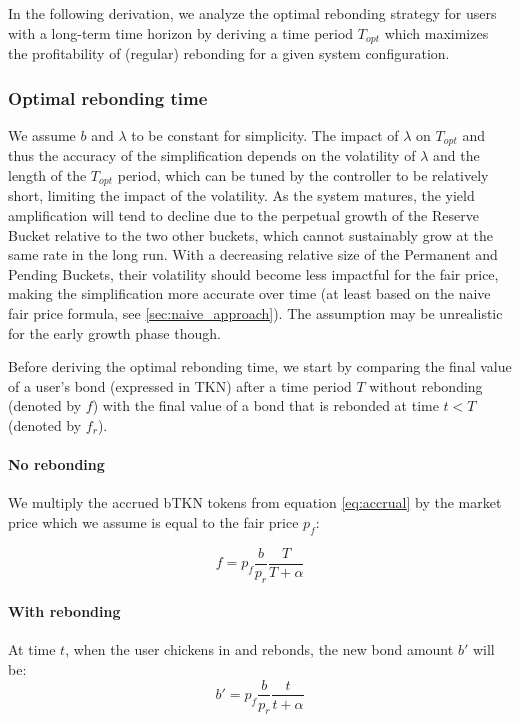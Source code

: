 \documentclass{article}
\begin{document}
In the following derivation, we analyze the optimal rebonding strategy for users with a long-term time horizon by deriving a time period $T_{opt}$ which maximizes the profitability of (regular) rebonding for a given system configuration.

\subsubsection{Optimal rebonding time}
  \label{sec:T_OP}
We assume $b$ and $\lambda$ to be constant for simplicity. The impact of $\lambda$ on $T_{opt}$ and thus the accuracy of the simplification depends on the volatility of $\lambda$ and the length of the $T_{opt}$ period, which can be tuned by the controller to be relatively short, limiting the impact of the volatility. As the system matures, the yield amplification will tend to decline due to the perpetual growth of the Reserve Bucket relative to the two other buckets, which cannot sustainably grow at the same rate in the long run. With a decreasing relative size of the Permanent and Pending Buckets, their volatility should become less impactful for the fair price, making the simplification more accurate over time (at least based on the naive fair price formula, see \ref{sec:naive_approach}). The assumption may be unrealistic for the early growth phase though.

Before deriving the optimal rebonding time, we start by comparing the final value of a user's bond (expressed in TKN) after a time period $T$ without rebonding (denoted by $f$) with the final value of a bond that is rebonded at time $t<T$ (denoted by $f_r$).

\paragraph{No rebonding}
We multiply the accrued bTKN tokens from equation \ref{eq:accrual} by the market price which we assume is equal to the fair price $p_f$:

\begin{equation}
  \label{eq:o-s}
f = p_f\frac{b}{p_r}\frac{T}{T+\alpha}
\end{equation}

\paragraph{With rebonding}
At time $t$, when the user chickens in and rebonds, the new bond amount $b'$ will be:
\begin{equation}
b'= p_f\frac{b}{p_r}\frac{t}{t+\alpha}
\end{equation}
\end{document}
